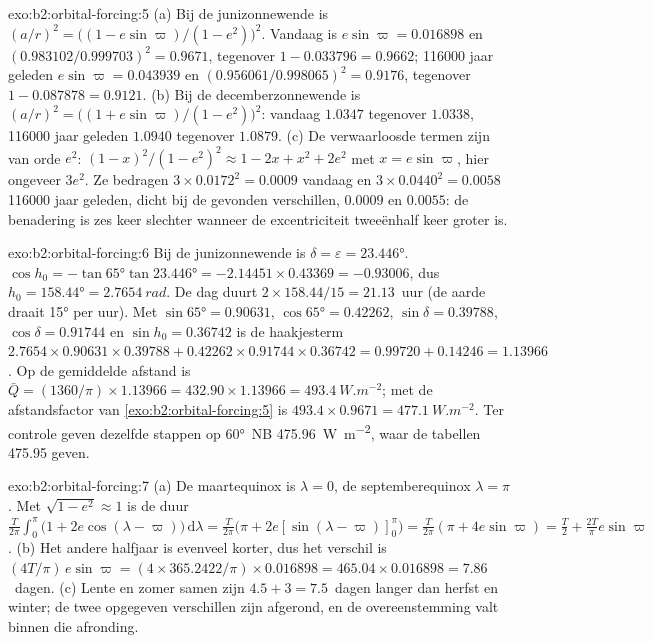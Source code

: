 \begin{solution}{exo:b2:orbital-forcing:5}
(a) Bij de junizonnewende is $(a/r)^2 = \bigl((1 - e\sin\varpi)/(1 - e^2)\bigr)^2$. Vandaag is $e\sin\varpi
= 0.016898$ en $(0.983102/0.999703)^2 = 0.9671$, tegenover $1 - 0.033796 = 0.9662$;
\num{116000} jaar geleden $e\sin\varpi = 0.043939$ en $(0.956061/0.998065)^2 = 0.9176$, tegenover $1 -
0.087878 = 0.9121$. (b) Bij de decemberzonnewende is $(a/r)^2 = \bigl((1 + e\sin\varpi)/(1 -
e^2)\bigr)^2$: vandaag $1.0347$ tegenover $1.0338$, \num{116000} jaar geleden $1.0940$ tegenover $1.0879$.
(c) De verwaarloosde termen zijn van orde $e^2$: $(1 - x)^2/(1 - e^2)^2 \approx 1 - 2x + x^2 + 2e^2$
met $x = e\sin\varpi$, hier ongeveer $3e^2$. Ze bedragen $3 \times 0.0172^2 = 0.0009$ vandaag en $3
\times 0.0440^2 = 0.0058$ \num{116000} jaar geleden, dicht bij de gevonden verschillen, $0.0009$ en
$0.0055$: de benadering is zes keer slechter wanneer de excentriciteit tweeënhalf keer
groter is.
\end{solution}

\begin{solution}{exo:b2:orbital-forcing:6}
Bij de junizonnewende is $\delta = \varepsilon = \ang{23.446}$. $\cos h_0 = -\tan\ang{65}\tan\ang{23.446}
= -2.14451 \times 0.43369 = -0.93006$, dus $h_0 = \ang{158.44} = \qty{2.7654}{rad}$. De dag duurt
$2 \times 158.44/15 = 21.13$~uur (de aarde draait \ang{15} per uur). Met $\sin\ang{65} = 0.90631$,
$\cos\ang{65} = 0.42262$, $\sin\delta = 0.39788$, $\cos\delta = 0.91744$ en $\sin h_0 = 0.36742$
is de haakjesterm $2.7654 \times 0.90631 \times 0.39788 + 0.42262 \times 0.91744 \times 0.36742 = 0.99720
+ 0.14246 = 1.13966$. Op de gemiddelde afstand is $\bar Q = (1360/\pi) \times 1.13966 = 432.90 \times 1.13966
= \qty{493.4}{W.m^{-2}}$; met de afstandsfactor van \cref{exo:b2:orbital-forcing:5} is $493.4 \times
0.9671 = \qty{477.1}{W.m^{-2}}$. Ter controle geven dezelfde stappen op \ang{60}~NB \qty{475.96}{W.m^{-2}}, waar de tabellen \num{475.95} geven.
\end{solution}

\begin{solution}{exo:b2:orbital-forcing:7}
(a) De maartequinox is $\lambda = 0$, de septemberequinox $\lambda = \pi$. Met $\sqrt{1 - e^2}
\approx 1$ is de duur $\frac{T}{2\pi}\int_0^{\pi}\bigl(1 + 2e\cos(\lambda -
\varpi)\bigr)\,\mathrm d\lambda = \frac{T}{2\pi}\bigl(\pi + 2e[\sin(\lambda - \varpi)]_0^{\pi}\bigr)
= \frac{T}{2\pi}(\pi + 4e\sin\varpi) = \frac T2 + \frac{2T}{\pi}e\sin\varpi$. (b) Het andere halfjaar
is evenveel korter, dus het verschil is $(4T/\pi)\,e\sin\varpi = (4 \times
365.2422/\pi) \times 0.016898 = 465.04 \times 0.016898 = 7.86$~dagen. (c) Lente en zomer samen
zijn $4.5 + 3 = 7.5$~dagen langer dan herfst en winter; de twee opgegeven verschillen zijn afgerond, en de
overeenstemming valt binnen die afronding.
\end{solution}

